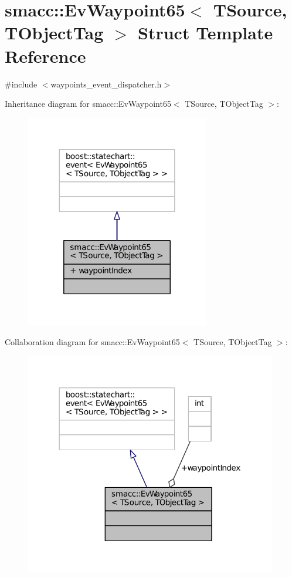 \hypertarget{structsmacc_1_1EvWaypoint65}{}\section{smacc\+:\+:Ev\+Waypoint65$<$ T\+Source, T\+Object\+Tag $>$ Struct Template Reference}
\label{structsmacc_1_1EvWaypoint65}


{\ttfamily \#include $<$waypoints\+\_\+event\+\_\+dispatcher.\+h$>$}



Inheritance diagram for smacc\+:\+:Ev\+Waypoint65$<$ T\+Source, T\+Object\+Tag $>$\+:
\nopagebreak
\begin{figure}[H]
\begin{center}
\leavevmode
\includegraphics[width=227pt]{structsmacc_1_1EvWaypoint65__inherit__graph}
\end{center}
\end{figure}


Collaboration diagram for smacc\+:\+:Ev\+Waypoint65$<$ T\+Source, T\+Object\+Tag $>$\+:
\nopagebreak
\begin{figure}[H]
\begin{center}
\leavevmode
\includegraphics[width=312pt]{structsmacc_1_1EvWaypoint65__coll__graph}
\end{center}
\end{figure}
